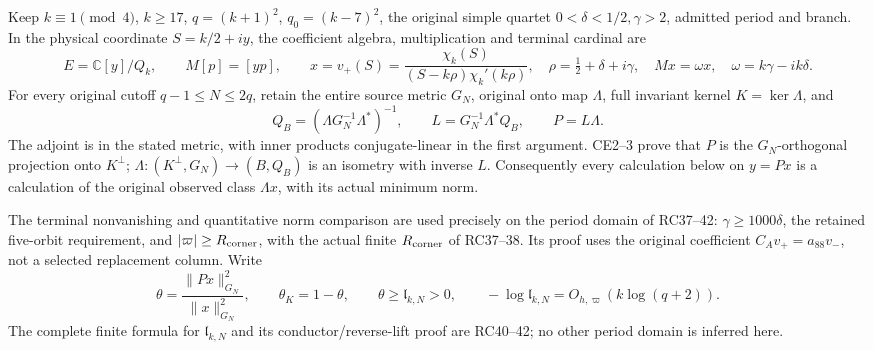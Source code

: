 \documentclass[10pt]{article}
\begin{document}
Keep \(k\equiv1\pmod4\), \(k\ge17\), \(q=(k+1)^2\), \(q_0=(k-7)^2\), the original simple quartet \(0<\delta<1/2,\gamma>2\), admitted period and branch. In the physical coordinate \(S=k/2+iy\), the coefficient algebra, multiplication and terminal cardinal are \[
E=\mathbb C[y]/Q_k,\qquad M[p]=[yp],\qquad
x=v_+(S)=\frac{\chi_k(S)}{(S-k\rho)\chi_k'(k\rho)},\quad
\rho=\tfrac12+\delta+i\gamma,\quad
Mx=\omega x,\quad\omega=k\gamma-ik\delta.
\tag{TR1}
\] For every original cutoff \(q-1\le N\le2q\), retain the entire source metric \(G_N\), original onto map \(\Lambda\), full invariant kernel \(K=\ker\Lambda\), and \[
Q_B=(\Lambda G_N^{-1}\Lambda^*)^{-1},\qquad
L=G_N^{-1}\Lambda^*Q_B,\qquad P=L\Lambda.
\tag{TR2}
\] The adjoint is in the stated metric, with inner products conjugate-linear in the first argument. CE2--3 prove that \(P\) is the \(G_N\)-orthogonal projection onto \(K^\perp\); \(\Lambda:(K^\perp,G_N)\to(B,Q_B)\) is an isometry with inverse \(L\). Consequently every calculation below on \(y=Px\) is a calculation of the original observed class \(\Lambda x\), with its actual minimum norm.

The terminal nonvanishing and quantitative norm comparison are used precisely on the period domain of RC37--42: \(\gamma\ge1000\delta\), the retained five-orbit requirement, and \(|\varpi|\ge R_{\rm corner}\), with the actual finite \(R_{\rm corner}\) of RC37--38. Its proof uses the original coefficient \(C_Av_+=a_{88}v_-\), not a selected replacement column. Write \[
\theta=\frac{\|Px\|_{G_N}^2}{\|x\|_{G_N}^2},\qquad
\theta_K=1-\theta,\qquad
\theta\ge\mathfrak l_{k,N}>0,\qquad
-\log\mathfrak l_{k,N}=O_{h,\varpi}(k\log(q+2)).
\tag{TR3}
\] The complete finite formula for \(\mathfrak l_{k,N}\) and its conductor/reverse-lift proof are RC40--42; no other period domain is inferred here.
\end{document}
